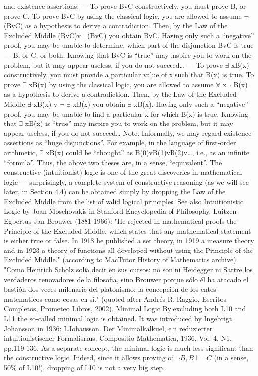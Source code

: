 and existence assertions:
--- To prove BvC constructively, you must prove B, or prove C. To prove BvC by using the classical logic,
you are allowed to assume \(\neg\) (BvC) as a hypothesis to derive a contradiction. Then, by the Law of the
Excluded Middle (BvC)v\(\neg\) (BvC) you obtain BvC. Having only such a ``negative'' proof, you may be
unable to determine, which part of the disjunction BvC is true --- B, or C, or both. Knowing that BvC is
``true'' may inspire you to work on the problem, but it may appear useless, if you do not succeed\ldots 
--- To prove \(\exists\) xB(x) constructively, you must provide a particular value of x such that B(x) is true. To
prove \(\exists\) xB(x) by using the classical logic, you are allowed to assume \(\forall\) x\(\neg\) B(x) as a hypothesis to derive a
contradiction. Then, by the Law of the Excluded Middle \(\exists\) xB(x) v \(\neg\) \(\exists\) xB(x) you obtain \(\exists\) xB(x). Having
only such a ``negative'' proof, you may be unable to find a particular x for which B(x) is true. Knowing
that \(\exists\) xB(x) is ``true'' may inspire you to work on the problem, but it may appear useless, if you do not
succeed\ldots 
Note. Informally, we may regard existence assertions as ``huge disjunctions''. For example, in the
language of first-order arithmetic, \(\exists\) xB(x) could be ``thought'' as B(0)vB(1)vB(2)v\ldots , i.e., as an infinite
``formula''. Thus, the above two theses are, in a sense, ``equivalent''.
The constructive (intuitionist) logic is one of the great discoveries in mathematical logic --- surprisingly, a
complete system of constructive reasoning (as we will see later, in Section 4.4) can be obtained simply by
dropping the Law of the Excluded Middle from the list of valid logical principles.
See also Intuitionistic Logic by Joan Moschovakis in Stanford Encyclopedia of Philosophy.
Luitzen Egbertus Jan Brouwer (1881-1966): "He rejected in mathematical proofs the Principle of the Excluded Middle, which
states that any mathematical statement is either true or false. In 1918 he published a set theory, in 1919 a measure theory and in
1923 a theory of functions all developed without using the Principle of the Excluded Middle." (according to MacTutor History
of Mathematics archive). "Como Heinrich Scholz solia decir en sus cursos: no son ni Heidegger ni Sartre los verdaderos
renovadores de la filosofia, sino Brouwer porque sólo él ha atacado el bastión dos veces milenario del platonismo: la
concepción de los entes matematicos como cosas en si." (quoted after Andrés R. Raggio, Escritos Completos, Prometeo Libros,
2002).
Minimal Logic
By excluding both L10 and L11 the so-called minimal logic is obtained. It was introduced by Ingebrigt
Johansson in 1936:
I.Johansson. Der Minimalkalkuel, ein reduzierter intuitionistischer Formalismus. Compositio Mathematica, 1936, Vol. 4, N1,
pp.119-136.
As a separate concept, the minimal logic is much less significant than the constructive logic. Indeed, since
it allows proving of \(\neg B, B \vdash \neg C\) (in a sense, 50\% of L10!), dropping of L10 is not a very big step.

